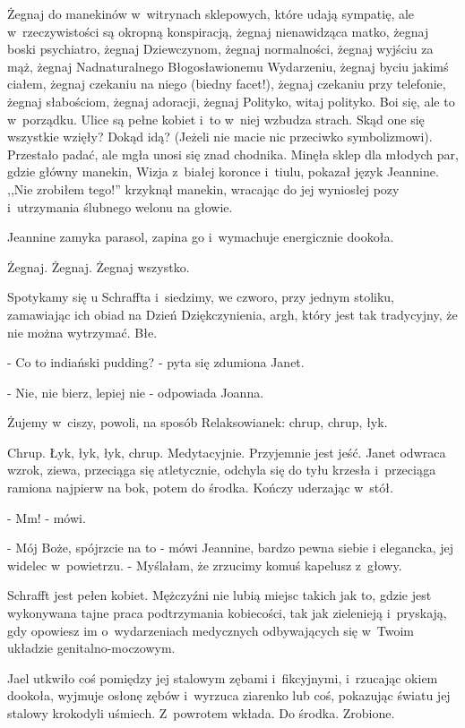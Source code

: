 \documentclass[oneside,polish,12pt,sfheadings]{mwbk}
\begin{document}
Żegnaj do manekinów w~witrynach sklepowych, które udają sympatię,
ale w~rzeczywistości są okropną konspiracją, żegnaj nienawidząca matko,
żegnaj boski psychiatro, żegnaj Dziewczynom, żegnaj normalności, żegnaj
wyjściu za mąż, żegnaj Nadnaturalnego Błogosławionemu Wydarzeniu,
żegnaj byciu jakimś ciałem, żegnaj czekaniu na niego (biedny facet!),
żegnaj czekaniu przy telefonie, żegnaj słabościom, żegnaj adoracji,
żegnaj Polityko, witaj polityko. Boi się, ale to w~porządku. Ulice
są pełne kobiet i~to w~niej wzbudza strach. Skąd one się wszystkie
wzięły? Dokąd idą? (Jeżeli nie macie nic przeciwko symbolizmowi).
Przestało padać, ale mgła unosi się znad chodnika. Minęła sklep dla
młodych par, gdzie główny manekin, Wizja z~białej koronce i~tiulu,
pokazał język Jeannine. ,,Nie zrobiłem tego!'' krzyknął manekin, wracając
do jej wyniosłej pozy i~utrzymania ślubnego welonu na głowie.

Jeannine zamyka parasol, zapina go i~wymachuje energicznie dookoła.

Żegnaj. Żegnaj. Żegnaj wszystko.

Spotykamy się u Schraffta i~siedzimy, we czworo, przy jednym stoliku,
zamawiając ich obiad na Dzień Dziękczynienia, argh, który jest tak
tradycyjny, że nie można wytrzymać. Błe.

- Co to indiański pudding? - pyta się zdumiona Janet.

- Nie, nie bierz, lepiej nie - odpowiada Joanna.

Żujemy w~ciszy, powoli, na sposób Relaksowianek: chrup, chrup, łyk.

Chrup. Łyk, łyk, łyk, chrup. Medytacyjnie. Przyjemnie jest jeść. Janet
odwraca wzrok, ziewa, przeciąga się atletycznie, odchyla się do tyłu
krzesła i~przeciąga ramiona najpierw na bok, potem do środka. Kończy
uderzając w~stół. 

- Mm! - mówi.

- Mój Boże, spójrzcie na to - mówi Jeannine, bardzo pewna siebie i
elegancka, jej widelec w~powietrzu. - Myślałam, że zrzucimy komuś
kapelusz z~głowy.

Schrafft jest pełen kobiet. Mężczyźni nie lubią miejsc takich jak to,
gdzie jest wykonywana tajne praca podtrzymania kobiecości, tak jak
zielenieją i~pryskają, gdy opowiesz im o~wydarzeniach medycznych odbywających
się w~Twoim układzie genitalno-moczowym.

Jael utkwiło coś pomiędzy jej stalowym zębami i~fikcyjnymi, i~rzucając
okiem dookoła, wyjmuje osłonę zębów i~wyrzuca ziarenko lub coś, pokazując
światu jej stalowy krokodyli uśmiech. Z~powrotem wkłada. Do środka.
Zrobione.
\end{document}

